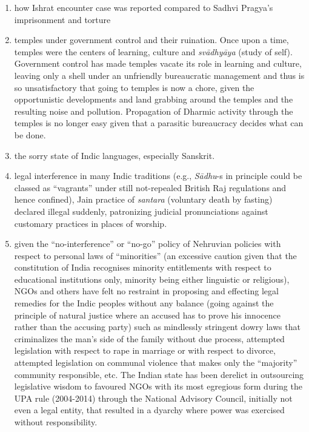 {
\begin{enumerate}
\item how Ishrat encounter case was reported compared to Sadhvi Pragya’s imprisonment and torture
\item temples under government control and their ruination. Once upon a time, temples were the centers of learning, culture and {\sl svādhyāya} (study of self). Government control has made temples vacate its role in learning and culture, leaving only a shell under an unfriendly  bureaucratic management and thus is so unsatisfactory that going to temples is now a chore, given the opportunistic developments and land grabbing around the temples and the resulting noise and pollution. Propagation of Dharmic activity through the temples is no longer easy given that a parasitic bureaucracy decides what can be done.
\item the sorry state of Indic languages, especially Sanskrit.
\item legal interference in many Indic traditions (e.g., \textsl{Sādhu}-s in principle could be classed as “vagrants” under still not-repealed British Raj regulations and hence confined), Jain practice of {\sl santara} (voluntary death by fasting) declared illegal suddenly, patronizing judicial pronunciations against customary practices in places of worship.
\item given the “no-interference” or “no-go” policy of Nehruvian policies with respect to personal laws of “minorities” (an excessive caution given that the constitution of India recognises minority entitlements with respect to educational institutions only, minority being either linguistic or religious), NGOs and others have felt no restraint in proposing and effecting legal remedies for the Indic peoples without any balance (going against the principle of natural justice where an accused has to prove his innocence rather than the accusing party) such as mindlessly stringent dowry laws that criminalizes the man’s side of the family without due process, attempted legislation with respect to rape in marriage or with respect to divorce, attempted legislation on communal violence that makes only the “majority” community responsible, etc. The Indian state has been derelict in outsourcing legislative wisdom to favoured NGOs with its most egregious form during the UPA rule (2004-2014) through the National Advisory Council, initially not even a legal entity, that resulted in a dyarchy where power was exercised without responsibility.
\end{enumerate}}


